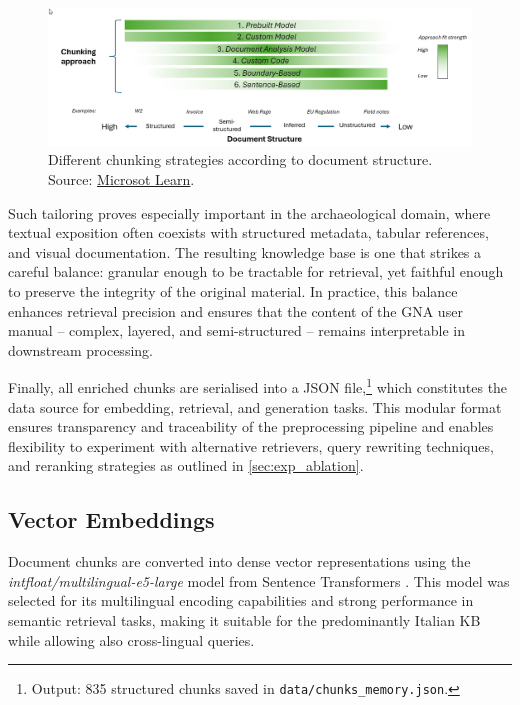 \begin{spacing}{1.5}
\vspace{0.8em}
\begin{figure}[H]
  \centering
  \includegraphics[width=\textwidth]{images/chunking-approaches-by-document-structure.png} 
  \caption{Different chunking strategies according to document structure.\\
  \footnotesize{Source: \href{https://web.archive.org/web/20250825093743/https://learn.microsoft.com/en-us/azure/architecture/ai-ml/guide/rag/rag-chunking-phase}{Microsot Learn}}.}
  \label{fig:chunking_approach}
\end{figure}

Such tailoring proves especially important in the archaeological domain, where textual exposition often coexists with structured metadata, tabular references, and visual documentation. The resulting knowledge base is one that strikes a careful balance: granular enough to be tractable for retrieval, yet faithful enough to preserve the integrity of the original material. In practice, this balance enhances retrieval precision and ensures that the content of the GNA user manual -- complex, layered, and semi-structured -- remains interpretable in downstream processing.

Finally, all enriched chunks are serialised into a JSON file,\footnote{Output: 835 structured chunks saved in \texttt{data/chunks\_memory.json}.} which constitutes the data source for embedding, retrieval, and generation tasks. This modular format ensures transparency and traceability of the preprocessing pipeline and enables flexibility to experiment with alternative retrievers, query rewriting techniques, and reranking strategies as outlined in \autoref{sec:exp_ablation}.

\sloppy
\subsection{Vector Embeddings}
Document chunks are converted into dense vector representations using the \textit{intfloat/multilingual-e5-large} model from Sentence Transformers \citep{wang_multilingual_2024}. This model was selected for its multilingual encoding capabilities and strong performance in semantic retrieval tasks, making it suitable for the predominantly Italian KB while allowing also cross-lingual queries. 


\end{spacing}
